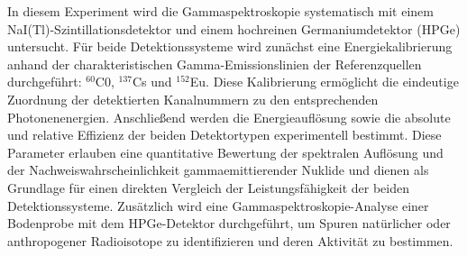In diesem Experiment wird die Gammaspektroskopie systematisch mit einem NaI(Tl)-Szintillationsdetektor und einem hochreinen Germaniumdetektor (HPGe) untersucht. Für beide Detektionssysteme wird zunächst eine Energiekalibrierung anhand der charakteristischen Gamma-Emissionslinien der Referenzquellen durchgeführt:
$^{60}$C0, $^{137}$Cs und $^{152}$Eu. Diese Kalibrierung ermöglicht die eindeutige Zuordnung der detektierten Kanalnummern zu den entsprechenden Photonenenergien.
Anschließend werden die Energieauflösung sowie die absolute und relative Effizienz der beiden Detektortypen experimentell bestimmt. Diese Parameter erlauben eine quantitative Bewertung der spektralen Auflösung und der Nachweiswahrscheinlichkeit gammaemittierender Nuklide und dienen als Grundlage für einen direkten Vergleich der Leistungsfähigkeit der beiden Detektionssysteme.
Zusätzlich wird eine Gammaspektroskopie-Analyse einer Bodenprobe mit dem HPGe-Detektor durchgeführt, um Spuren natürlicher oder anthropogener Radioisotope zu identifizieren und deren Aktivität zu bestimmen.